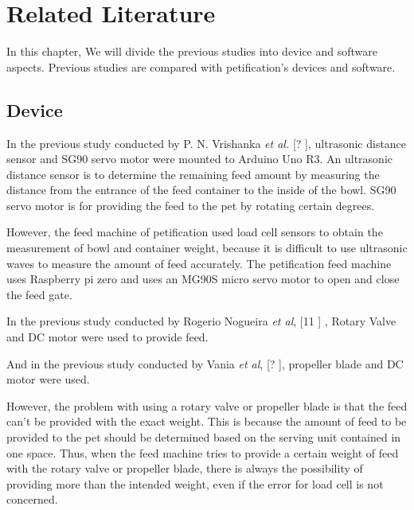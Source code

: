 \documentclass[conference]{IEEEtran}
\begin{document}
\section{Related Literature}
In this chapter, We will divide the previous studies into device and software aspects. Previous studies are compared with petification's devices and software.

\subsection{Device}
In the previous study conducted by P. N. Vrishanka \textit{et al.} [?
], ultrasonic distance sensor and SG90 servo motor were mounted to Arduino Uno R3. An ultrasonic distance sensor is to determine the remaining feed amount by measuring the distance from the entrance of the feed container to the inside of the bowl. SG90 servo motor is for providing the feed to the pet by rotating certain degrees.

However, the feed machine of petification used load cell sensors to obtain the measurement of bowl and container weight, because it is difficult to use ultrasonic waves to measure the amount of feed accurately. The petification feed machine uses Raspberry pi zero and uses an MG90S micro servo motor to open and close the feed gate. 

 In the previous study conducted by Rogerio Nogueira \textit{et al}, [11
] , Rotary Valve and DC motor were used to provide feed.

And in the previous study conducted by Vania \textit{et al}, [?
], propeller blade and DC motor were used.

However, the problem with using a rotary valve or propeller blade is that the feed can’t be provided with the exact weight. This is because the amount of feed to be provided to the pet should be determined based on the serving unit contained in one space. Thus, when the feed machine tries to provide a certain weight of feed with the rotary valve or propeller blade, there is always the possibility of providing more than the intended weight, even if the error for load cell is not concerned.
\end{document}
